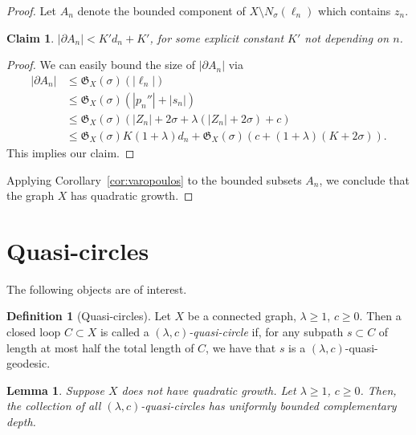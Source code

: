 \documentclass[11pt,a4paper]{amsart}
\newtheorem{lemma}[theorem]{Lemma}
\newtheorem{claim}[theorem]{Claim}
\theoremstyle{definition}
\newtheorem{definition}[theorem]{Definition}
\newcommand{\growth}{\mathfrak{G}}
\begin{document}
\begin{proof}
    Let $A_n$ denote the bounded component of $X \setminus N_\sigma(\ell_n)$ which contains $z_n$. 

    \begin{claim}
        $|\partial A_n| < K' d_n + K'$, for some explicit constant $K'$ not depending on $n$.  
    \end{claim}

    \begin{proof}
        We can easily bound the size of $|\partial A_n|$ via
        \begin{align*}
            |\partial A_n| &\leq \growth_X(\sigma) (|\ell_n|) \\
            &\leq \growth_X(\sigma) (|p_n''| + |s_n|) \\
            &\leq \growth_X(\sigma) (|Z_n| + 2\sigma + \lambda (|Z_n| + 2\sigma) + c) \\
            &\leq \growth_X(\sigma) K (1+\lambda) d_n + \growth_X(\sigma)(c + (1+\lambda)(K+2\sigma)).
        \end{align*}
        This implies our claim.
    \end{proof}

    Applying Corollary~\ref{cor:varopoulos} to the bounded subsets $A_n$, we conclude that the graph $X$ has quadratic growth.
\end{proof}



\section{Quasi-circles}\label{sec:circles}

The following objects are of interest.

\begin{definition}[Quasi-circles]
    Let $X$ be a connected graph, $\lambda \geq 1$, $c \geq 0$. Then a closed loop $C \subset X$ is called a \emph{$(\lambda, c)$-quasi-circle} if, for any subpath $s \subset C$ of length at most half the total length of $C$, we have that $s$ is a $(\lambda, c)$-quasi-geodesic. 
\end{definition}
    


\begin{lemma}\label{lem:quasi-circles-coarsely-peripheral}
    Suppose $X$ does not have quadratic growth. Let $\lambda \geq 1$, $c \geq 0$.  Then, the collection of all $(\lambda, c)$-quasi-circles has uniformly bounded complementary depth. 
\end{lemma}
\end{document}
